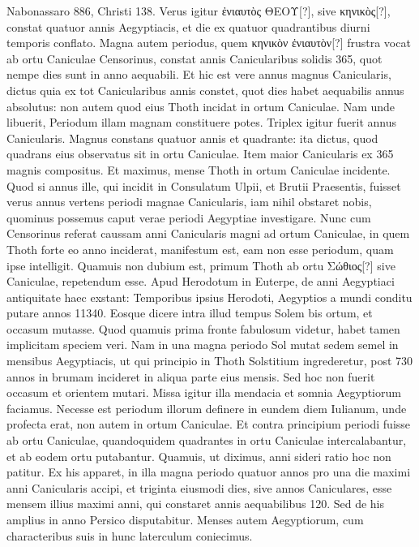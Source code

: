  Nabonassaro
886, Christi 138.
Verus igitur \textgreek{ἐνιαυτὸς ΘΕΟΥ}[?], sive \textgreek{κηνικὸς}[?],
constat quatuor annis Aegyptiacis, et die ex quatuor quadrantibus
diurni temporis conflato.
Magna autem periodus, quem \textgreek{κηνικὸν
ἐνιαυτὸν}[?] frustra vocat ab ortu Caniculae Censorinus,
 constat annis Canicularibus
solidis 365, quot nempe dies sunt in anno aequabili.
Et hic est vere annus magnus Canicularis,
 dictus quia ex tot Canicularibus
annis constet, quot dies habet aequabilis annus absolutus:
non autem quod eius Thoth incidat in ortum Caniculae.
Nam
unde libuerit, Periodum illam magnam constituere potes.
Triplex
igitur fuerit annus Canicularis.
Magnus constans quatuor annis et
quadrante: ita dictus, quod quadrans eius observatus sit in ortu Caniculae.
Item maior Canicularis ex 365 magnis compositus.
Et maximus, mense Thoth in ortum Caniculae incidente.
Quod si annus
ille, qui incidit in Consulatum Ulpii, et Brutii Praesentis, fuisset verus
annus vertens periodi magnae Canicularis, iam nihil obstaret
nobis, quominus possemus caput verae periodi Aegyptiae investigare.
Nunc cum Censorinus referat caussam anni Canicularis
magni ad ortum Caniculae, in quem Thoth forte eo anno inciderat,
manifestum est, eam non esse periodum, quam ipse intelligit.
Quamuis non dubium est, primum Thoth ab ortu \textgreek{Σώθιος}[?] sive
Caniculae, repetendum esse.
Apud Herodotum in Euterpe, de anni
Aegyptiaci antiquitate haec exstant: Temporibus ipsius Herodoti,
Aegyptios a mundi conditu putare annos 11340.
Eosque dicere intra
illud tempus Solem bis ortum, et occasum mutasse.
Quod quamuis
prima fronte fabulosum videtur, habet tamen implicitam speciem
veri.
%
Nam in una magna periodo Sol mutat sedem semel in mensibus
Aegyptiacis, ut qui principio in Thoth Solstitium ingrederetur,
post 730 annos in brumam incideret in aliqua parte eius mensis.
Sed
hoc non fuerit occasum et orientem mutari.
Missa igitur illa mendacia et somnia
Aegyptiorum faciamus.
Necesse est periodum
illorum definere in eundem diem Iulianum,
unde profecta erat, non autem in
ortum Caniculae.
Et contra principium
periodi fuisse ab ortu Caniculae, quandoquidem
quadrantes in ortu Caniculae intercalabantur,
et ab eodem ortu putabantur.
Quamuis, ut diximus, anni sideri ratio
hoc non patitur.
Ex his apparet, in
illa magna periodo quatuor annos pro
una die maximi anni Canicularis accipi,
et triginta eiusmodi dies, sive annos Caniculares,
esse mensem illius maximi anni, qui constaret annis aequabilibus
120.
Sed de his amplius in anno Persico disputabitur.
Menses autem Aegyptiorum, cum characteribus suis in hunc laterculum
coniecimus.
%
\begin{table}[tb]
  
\end{table}
%
